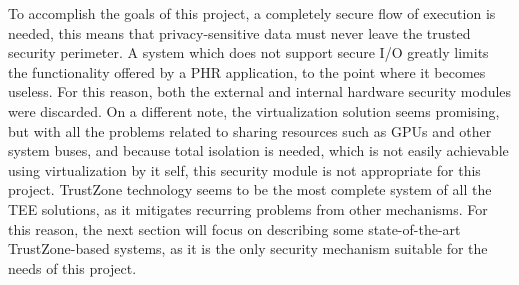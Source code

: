 To accomplish the goals of this project, a completely secure flow of execution is needed, this means that privacy-sensitive data must never leave the trusted security perimeter. %
A system which does not support secure I/O greatly limits the functionality offered by a \ac{PHR} application, to the point where it becomes useless. For this reason, both the external and internal hardware security modules were discarded. On a different note, the virtualization solution seems promising, but with all the problems related to sharing resources such as \ac{GPUs} and other system buses, and because total isolation is needed, which is not easily achievable using virtualization by it self, this security module is not appropriate for this project. TrustZone technology seems to be the most complete system of all the \ac{TEE} solutions, as it mitigates recurring problems from other mechanisms. For this reason, the next section will focus on describing some state-of-the-art TrustZone-based systems, as it is the only security mechanism suitable for the needs of this project.


